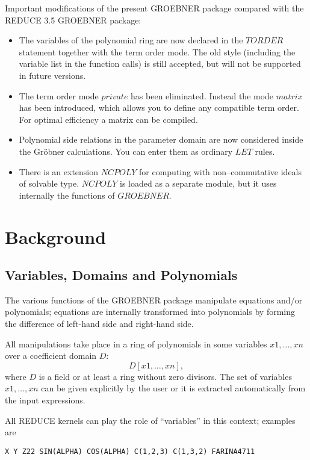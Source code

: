 Important modifications of the present GROEBNER package compared
with the REDUCE 3.5 GROEBNER package:
\begin{itemize}
\item The variables of the polynomial ring are now declared in the
      $TORDER$ statement together with the term order mode. The old
      style (including the variable list in the function calls)
      is still accepted, but will not be supported in future versions.
\item The term order mode $private$ has been eliminated. Instead the
      mode $matrix$ has been introduced, which allows you to
      define any compatible term order. For optimal efficiency
      a matrix can be compiled.
\item Polynomial side relations in the parameter domain are now
      considered inside the Gr\"obner calculations. You can enter
      them as ordinary $LET$ rules.
\item There is an extension $NCPOLY$  for computing with
      non--commutative ideals of solvable type. $NCPOLY$ is loaded
      as a separate module, but it uses internally the functions
      of $GROEBNER$.
\end{itemize}

\section{Background}

\subsection{Variables, Domains and Polynomials}

The various functions of the GROEBNER package manipulate
equations and/or polynomials; equations are internally
transformed into  polynomials by forming the difference of
left-hand side and right-hand side.

All manipulations take place in a ring of polynomials in some
variables $x1, \ldots , xn$ over a coefficient domain $D$:
\[
D [x1,\ldots , xn],
\]
where $D$ is a field or at least a ring without zero divisors.
The set of variables $x1,\ldots ,xn$ can be given explicitly by the
user or it is extracted automatically from the
input expressions.

All REDUCE kernels can play the role of ``variables'' in this context;
examples are

\begin{verbatim}
X Y Z22 SIN(ALPHA) COS(ALPHA) C(1,2,3) C(1,3,2) FARINA4711
\end{verbatim}

